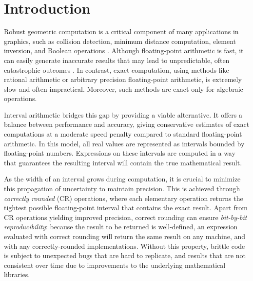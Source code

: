 
\section{Introduction}
\label{sec:introduction}
Robust geometric computation is a critical component of many applications in graphics, such as collision detection, minimum distance computation, element inversion, and Boolean operations \cite{Sichetti2025}. 
Although floating-point arithmetic is fast, it can easily generate inaccurate results that may lead to unpredictable, often catastrophic outcomes \cite{Goldberg:1991,Bailey:2015}. 
In contrast, exact computation, using methods like rational arithmetic or arbitrary precision floating-point arithmetic, is extremely slow and often impractical.
Moreover, such methods are exact only for algebraic operations.

Interval arithmetic bridges this gap by providing a viable alternative.
It offers a balance between performance and accuracy, giving conservative estimates of exact computations at a moderate speed penalty compared to standard floating-point arithmetic. In this model, all real values are represented as intervals bounded by floating-point numbers. Expressions on these intervals are computed in a way that guarantees the resulting interval will contain the true mathematical result.

As the width of an interval grows during computation, it is crucial to minimize this propagation of uncertainty to maintain precision. This is achieved through \emph{correctly rounded} (CR) operations, where each elementary operation returns the tightest possible floating-point interval that contains the exact result.
Apart from CR operations yielding improved precision, correct rounding can ensure \emph{bit-by-bit reproducibility}: because the result to be returned is well-defined, an expression evaluated with correct rounding will return the same result on any machine, and with any correctly-rounded implementations.
Without this property, brittle code is subject to unexpected bugs that are hard to replicate, and results that are not consistent over time due to improvements to the underlying mathematical libraries.

%

